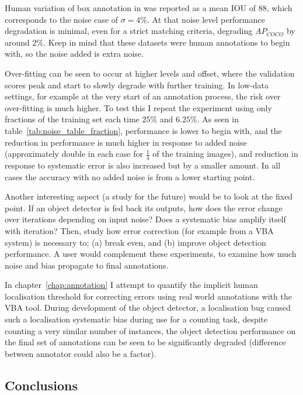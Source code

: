 Human variation of box annotation in \cite{Papadopoulos2017} was reported as a mean \gls{IOU} of 88, which corresponds to the noise case of $\sigma = 4\%$. At that noise level performance degradation is minimal, even for a strict matching criteria, degrading $AP_{COCO}$ by around $2\%$. Keep in mind that these datasets were human annotations to begin with, so the noise added is extra noise.


Over-fitting can be seen to occur at higher levels and offset, where the validation scores peak and start to slowly degrade with further training. In low-data settings, for example at the very start of an annotation process, the risk over over-fitting is much higher. To test this I repeat the experiment using only fractions of the training set each time $25\%$ and $6.25\%$. As seen in table~\ref{tab:noise_table_fraction}, performance is lower to begin with, and the reduction in performance is much higher in response to added noise (approximately double in each case for $\frac{1}{4}$ of the training images), and reduction in response to systematic error is also increased but by a smaller amount. In all cases the accuracy with no added noise is from a lower starting point.


Another interesting aspect (a study for the future) would be to look at the fixed point. If an object detector is fed back its outputs, how does the error change over iterations depending on input noise? Does a systematic bias amplify itself with iteration? Then, study how error correction (for example from a \gls{VBA} system) is necessary to; (a) break even, and (b) improve object detection performance. A user would complement these experiments, to examine how much noise and bias propagate to final annotations.

In chapter~\ref{chap:annotation} I attempt to quantify the implicit human localisation threshold for correcting errors using real world annotations with the \gls{VBA} tool. During development of the object detector, a localisation bug caused such a localisation systematic bias during use for a counting task, despite counting a very similar number of instances, the object detection performance on the final set of annotations can be seen to be significantly degraded (difference between annotator could also be a factor).

\subsection{Conclusions}

